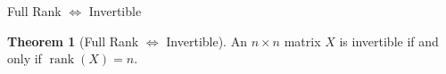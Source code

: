 \documentclass[10pt]{beamer}
\theoremstyle{definition}
\newtheorem{thm}{Theorem}[section]
\begin{document}
\begin{frame}{Full Rank $\iff$ Invertible}

\begin{thm}[Full Rank $\iff$ Invertible]
An $n \times n$ matrix $X$ is invertible if and only if $\operatorname{rank}(X) = n$.
\end{thm}

\end{frame}

\end{document}

